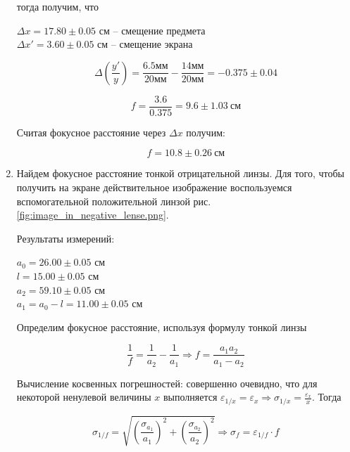 \begin{enumerate}
		тогда получим, что 
		
		\begin{center}
			$\Delta x = 17.80 \pm 0.05$ см -- смещение предмета \\
			$\Delta x' = 3.60 \pm 0.05$ см -- смещение экрана \\
		\end{center}
	
		\[ \Delta \left( \frac{y'}{y} \right) = \frac{6.5 \text{мм}}{20 \text{мм}} - \frac{14 \text{мм}}{20 \text{мм}} = -0.375 \pm 0.04 \]
		
		\[ f = \frac{3.6}{0.375} = 9.6 \pm 1.03 ~ \text{см} \]
		
		Считая фокусное расстояние через $\Delta x$ получим:
		
		\[ f = 10.8 \pm 0.26 ~ \text{см} \]
		
		\item Найдем фокусное расстояние тонкой отрицательной линзы. Для того, чтобы получить на экране действительное изображение воспользуемся вспомогательной положительной линзой рис. \ref{fig:image_in_negative_lense.png}.
		
		Результаты измерений:
		
		\begin{center}
			$a_0 = 26.00 \pm 0.05$ см \\
			$l = 15.00 \pm 0.05$ см \\
			$a_2 = 59.10 \pm 0.05$ см \\
			$a_1 = a_0 - l = 11.00 \pm 0.05$ см \\
		\end{center}
	
		Определим фокусное расстояние, используя формулу тонкой линзы
		
		\begin{equation}
			\frac{1}{f} = \frac{1}{a_2} - \frac{1}{a_1} \Rightarrow f = \frac{a_1 a_2}{a_1 - a_2}
		\end{equation}
		
		Вычисление косвенных погрешностей: совершенно очевидно, что для некоторой ненулевой величины $x$ выполняется $\displaystyle \varepsilon_{1/x} = \varepsilon_x \Rightarrow \sigma_{1/x} = \frac{\varepsilon_x}{x}$. Тогда
		
		\begin{equation}
			\sigma_{1/f} = \sqrt{\left (\frac{\sigma_{a_1}}{a_1} \right)^2 + \left (\frac{\sigma_{a_2}}{a_2} \right)^2} \Rightarrow \sigma_f = \varepsilon_{1/f} \cdot f
		\end{equation}
		

\end{enumerate}
